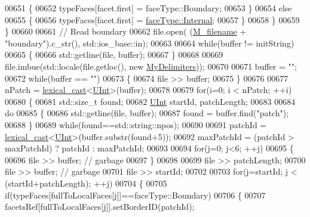 \begin{DoxyCode}
00651             \{
00652                 typeFaces[facet.first] = faceType::Boundary;
00653             \}
00654             \textcolor{keywordflow}{else}
00655             \{
00656                 typeFaces[facet.first] = \hyperlink{namespaceFVCode3D_a604c2047b7f400e68b30a8132178c822a7d38403d00598d4bb163911f9aa48294}{faceType::Internal};
00657             \}
00658         \}
00659     \}
00660 
00661     \textcolor{comment}{// Read boundary}
00662     file.open( (\hyperlink{classFVCode3D_1_1Importer_a318e689fb93c5c906f85aa13685724d7}{M\_filename} + \textcolor{stringliteral}{"boundary"}).c\_str(), std::ios\_base::in);
00663 
00664     \textcolor{keywordflow}{while}(buffer != initString)
00665     \{
00666         std::getline(file, buffer);
00667     \}
00668 
00669     file.imbue(std::locale(file.getloc(), \textcolor{keyword}{new} \hyperlink{structFVCode3D_1_1MyDelimiters}{MyDelimiters}));
00670 
00671     buffer = \textcolor{stringliteral}{""};
00672     \textcolor{keywordflow}{while}(buffer == \textcolor{stringliteral}{""})
00673     \{
00674         file >> buffer;
00675     \}
00676 
00677     nPatch = \hyperlink{namespaceFVCode3D_a7d8605df83383ec5cf62f7efe480a68a}{lexical\_cast}<\hyperlink{namespaceFVCode3D_a4bf7e328c75d0fd504050d040ebe9eda}{UInt}>(buffer);
00678 
00679     \textcolor{keywordflow}{for}(i=0; i < nPatch; ++i)
00680     \{
00681         std::size\_t found;
00682         \hyperlink{namespaceFVCode3D_a4bf7e328c75d0fd504050d040ebe9eda}{UInt} startId, patchLength;
00683 
00684         \textcolor{keywordflow}{do}
00685         \{
00686             std::getline(file, buffer);
00687             found = buffer.find(\textcolor{stringliteral}{"patch"});
00688         \}
00689         \textcolor{keywordflow}{while}(found==std::string::npos);
00690 
00691         patchId = \hyperlink{namespaceFVCode3D_a7d8605df83383ec5cf62f7efe480a68a}{lexical\_cast}<\hyperlink{namespaceFVCode3D_a4bf7e328c75d0fd504050d040ebe9eda}{UInt}>(buffer.substr(found+5));
00692         maxPatchId = (patchId > maxPatchId) ? patchId : maxPatchId;
00693 
00694         \textcolor{keywordflow}{for}(j=0; j<6; ++j)
00695         \{
00696             file >> buffer; \textcolor{comment}{// garbage}
00697         \}
00698 
00699         file >> patchLength;
00700         file >> buffer; \textcolor{comment}{// garbage}
00701         file >> startId;
00702 
00703         \textcolor{keywordflow}{for}(j=startId; j < (startId+patchLength); ++j)
00704         \{
00705             \textcolor{keywordflow}{if}(typeFaces[fullToLocalFaces[j]]==faceType::Boundary)
00706             \{
00707                 facetsRef[fullToLocalFaces[j]].setBorderID(patchId);

\end{DoxyCode}
